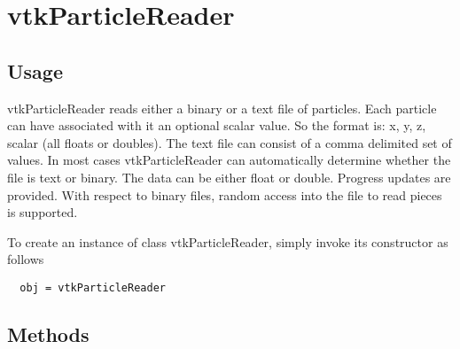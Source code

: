 \section{vtkParticleReader}

\subsection{Usage}

 vtkParticleReader reads either a binary or a text file of 
  particles. Each particle can have associated with it an optional
  scalar value. So the format is: x, y, z, scalar 
  (all floats or doubles). The text file can consist of a comma 
  delimited set of values. In most cases vtkParticleReader can 
  automatically determine whether the file is text or binary. 
  The data can be either float or double. 
  Progress updates are provided. 
  With respect to binary files, random access into the file to read 
  pieces is supported.
  

To create an instance of class vtkParticleReader, simply
invoke its constructor as follows
\begin{verbatim}
  obj = vtkParticleReader
\end{verbatim}
\subsection{Methods}

